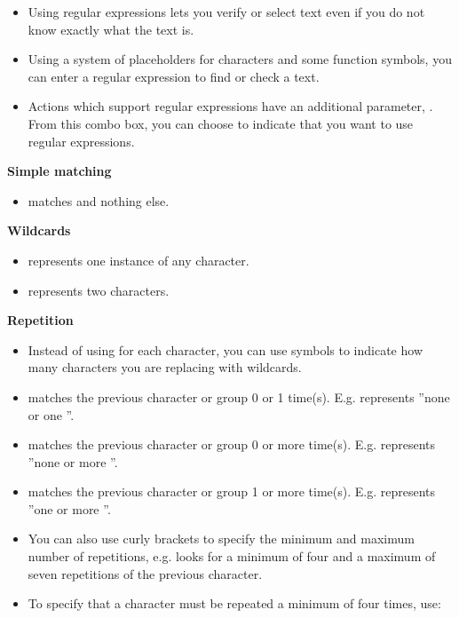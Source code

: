\newcommand{\gdrefregex}[3]{%
#1 & #2 & #3 \\%
}%

\newcommand{\bxcarat}{\verb+^+}
\begin{itemize}
\item Using regular expressions lets you verify or select text even if you do not know exactly what the text is.
\item Using a system of placeholders for characters and some function symbols, you can enter a regular expression to find or check a text.
\item Actions which support regular expressions have an additional parameter, . From this combo box, you can choose   to indicate that you want to use regular expressions.
\end{itemize}

\textbf{Simple matching}
\begin{itemize}
\item {} matches  and nothing else.
\end{itemize}

\textbf{Wildcards}
\begin{itemize}
\item {} represents one instance of any character.
\item {} represents two characters.  
\end{itemize}

\textbf{Repetition}
\begin{itemize}
\item Instead of using  for each character, you can use symbols to indicate how many characters you are replacing with wildcards.
\item {} matches the previous character or group 0 or 1 time(s). E.g.  represents ''none or one ''.
\item \bxshell{*} matches the previous character or group 0 or more time(s). E.g.  represents ''none or more ''.
\item \bxshell{+} matches the previous character or group 1 or more time(s). E.g.  represents ''one or more ''.
\item You can also use curly brackets \bxshell{\{\}}  to specify the minimum and maximum number of repetitions, e.g.  looks for a minimum of four and a maximum of seven repetitions of the previous character.
\item To specify that a character must be repeated a minimum of four times, use: 
\end{itemize}

